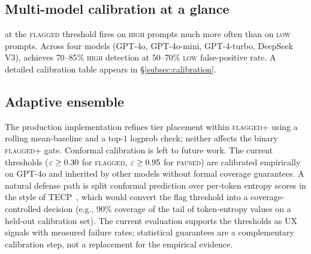 \subsection{Multi-model calibration at a glance}
\label{subsec:calibration-preview}

\eps at the \textsc{flagged} threshold fires on \textsc{high} prompts
much more often than on \textsc{low} prompts. Across four models
(GPT-4o, GPT-4o-mini, GPT-4-turbo, DeepSeek V3), \eps achieves
$70$--$85\%$ \textsc{high} detection at $50$--$70\%$ \textsc{low}
false-positive rate. A detailed calibration table appears in
\S\ref{subsec:calibration}.

\subsection{Adaptive ensemble}
\label{subsec:ensemble}

The production implementation refines tier placement within
\textsc{flagged+} using a rolling mean-\eps baseline and a top-$1$
logprob check; neither affects the binary \textsc{flagged+} gate.
Conformal calibration is left to future work. The current thresholds
($\varepsilon \ge 0.30$ for \textsc{flagged}, $\varepsilon \ge 0.95$ for
\textsc{paused}) are calibrated empirically on GPT-4o and inherited
by other models without formal coverage guarantees. A natural
defense path is split conformal prediction over per-token entropy
scores in the style of TECP~\cite{xu2025tecp}, which would convert
the flag threshold into a coverage-controlled decision (e.g., $90\%$
coverage of the tail of token-entropy values on a held-out
calibration set). The current evaluation supports the thresholds as
UX signals with measured failure rates; statistical guarantees are a
complementary calibration step, not a replacement for the empirical
evidence.
